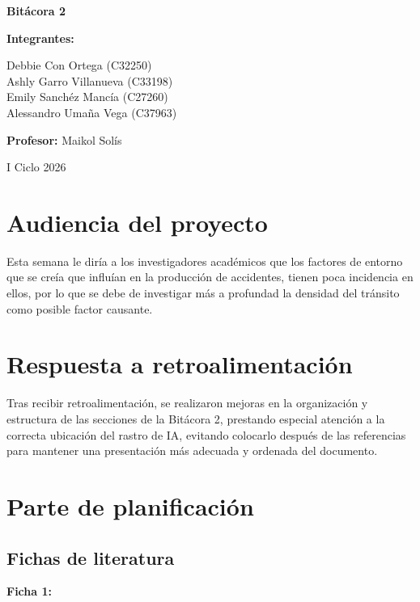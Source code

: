 \documentclass[12pt]{article}
\begin{document}
\begin{titlepage}
\centering
\vspace*{\fill}

{\Huge\bfseries Bitácora 2\par}
\vspace{1.5cm}

{\Large\textbf{Integrantes:}\par}
Debbie Con Ortega (C32250)\\
Ashly Garro Villanueva (C33198)\\
Emily Sanchéz Mancía (C27260)\\
Alessandro Umaña Vega (C37963)

\vspace{1cm}

{\Large\textbf{Profesor:} Maikol Solís\par}
\vspace{1.5cm}

{\Large I Ciclo 2026\par}

\vspace*{\fill}
\end{titlepage}
\tableofcontents
\newpage
\section{Audiencia del proyecto} 
Esta semana le diría a los investigadores académicos que los factores de entorno 
que se creía que influían en la producción de accidentes, tienen poca incidencia 
en ellos, por lo que se debe de investigar más a profundad la densidad del tránsito 
como posible factor causante. \\

\section{Respuesta a retroalimentación} 
Tras recibir retroalimentación, se realizaron mejoras en la organización y estructura 
de las secciones de la Bitácora 2, prestando especial atención a la correcta ubicación 
del rastro de IA, evitando colocarlo después de las referencias para mantener una 
presentación más adecuada y ordenada del documento. 


\section{Parte de planificación}
\subsection{Fichas de literatura}
\textbf{Ficha 1:}
\end{document}
